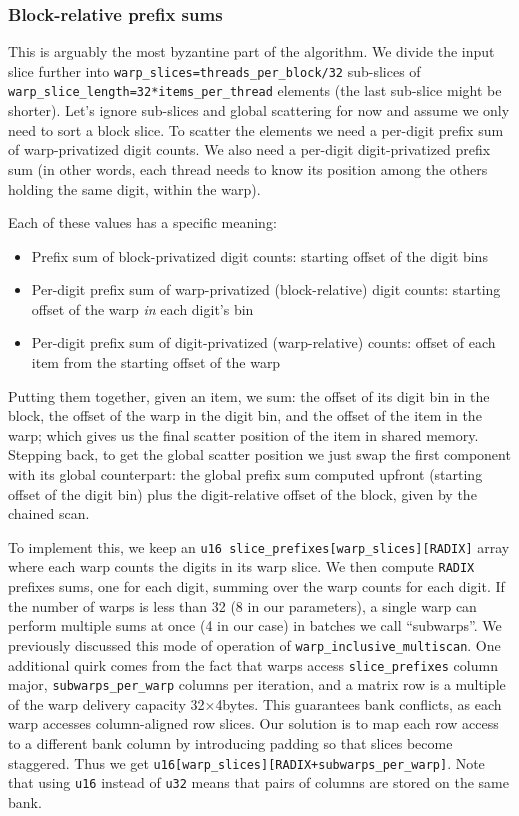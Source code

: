 \documentclass[a4paper]{report}
\begin{document}
\subsubsection{Block-relative prefix sums}

This is arguably the most byzantine part of the algorithm. We divide the input slice further into \lstinline{warp_slices=threads_per_block/32} sub-slices of \lstinline{warp_slice_length=32*items_per_thread} elements (the last sub-slice might be shorter). Let's ignore sub-slices and global scattering for now and assume we only need to sort a block slice. To scatter the elements we need a per-digit prefix sum of warp-privatized digit counts. We also need a per-digit digit-privatized prefix sum (in other words, each thread needs to know its position among the others holding the same digit, within the warp).

Each of these values has a specific meaning:

\begin{itemize}
  \item Prefix sum of block-privatized digit counts: starting offset of the digit bins
  \item Per-digit prefix sum of warp-privatized (block-relative) digit counts: starting offset of the warp \emph{in} each digit's bin
  \item Per-digit prefix sum of digit-privatized (warp-relative) counts: offset of each item from the starting offset of the warp
\end{itemize}

\newpage
\enlargethispage{1\baselineskip}

Putting them together, given an item, we sum: the offset of its digit bin in the block, the offset of the warp in the digit bin, and the offset of the item in the warp; which gives us the final scatter position of the item in shared memory. Stepping back, to get the global scatter position we just swap the first component with its global counterpart: the global prefix sum computed upfront (starting offset of the digit bin) plus the digit-relative offset of the block, given by the chained scan.

To implement this, we keep an \lstinline{u16 slice_prefixes[warp_slices][RADIX]} array where each warp counts the digits in its warp slice. We then compute \lstinline{RADIX} prefixes sums, one for each digit, summing over the warp counts for each digit. If the number of warps is less than 32 (8 in our parameters), a single warp can perform multiple sums at once (4 in our case) in batches we call ``subwarps''. We previously discussed this mode of operation of \lstinline{warp_inclusive_multiscan}. One additional quirk comes from the fact that warps access \lstinline{slice_prefixes} column major, \lstinline{subwarps_per_warp} columns per iteration, and a matrix row is a multiple of the warp delivery capacity 32$\times$4bytes. This guarantees bank conflicts, as each warp accesses column-aligned row slices. Our solution is to map each row access to a different bank column by introducing padding so that slices become staggered. Thus we get \lstinline{u16[warp_slices][RADIX+subwarps_per_warp]}. Note that using \lstinline{u16} instead of \lstinline{u32} means that pairs of columns are stored on the same bank.
\end{document}
